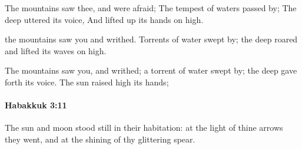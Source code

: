 			\begin{versebox}
					\item[BHS] 
					\item[LXX] 
					\item[ASV] The mountains saw thee, and were afraid; The tempest of waters passed by; The deep uttered its voice, And lifted up its hands on high.
					\item[NIV] the mountains saw you and writhed. Torrents of water swept by; the deep roared and lifted its waves on high.
					\item[NRSV] The mountains saw you, and writhed; a torrent of water swept by; the deep gave forth its voice. The sun raised high its hands;
			\end{versebox}

		\paragraph{Habakkuk 3:11} %
			\label{HABAKKUK-3-11}

			The sun and moon stood still in their habitation: at the light of thine arrows they went, and at the shining of thy glittering spear.

